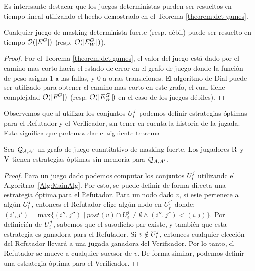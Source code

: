 	Es interesante destacar que los juegos deterministas pueden ser resueltos en tiempo lineal utilizando el hecho demostrado en el Teorema \ref{theorem:det-games}.
\begin{thm}\label{th:deterministic-qgame-complexity} 
  Cualquier juego de masking determinista fuerte (resp. débil) puede ser resuelto en tiempo $\mathcal{O}(|E^G|)$ (resp. $\mathcal{O}(|E_W^G|)$).
\end{thm}
\begin{proof} Por el Teorema \ref{theorem:det-games}, el valor del juego está dado por el camino mas corto hacia el estado de error en el grafo de juego donde la función de peso asigna $1$ a las fallas, y $0$ a otras transiciones. El algoritmo de Dial \cite{Dial69} puede ser utilizado para obtener el camino mas corto en este grafo, el cual tiene complejidad $\mathcal{O}(|E^G|)$  (resp. $\mathcal{O}(|E^G_W|)$ en el caso de los juegos débiles).
\qedhere
\end{proof} 

Observemos que al utilizar los conjuntos $U^j_i$ podemos definir estrategias óptimas para el Refutador y el Verificador, sin tener en cuenta la historia de la jugada. Esto significa que podemos dar el siguiente teorema.
 
\begin{thm} \label{thm:memoryless} Sea $\mathcal{Q}_{A, A'}$ un grafo de juego cuantitativo de masking fuerte.
  Los jugadores $\mathrm{R}$ y $\mathrm{V}$ tienen estrategias óptimas sin memoria para $\mathcal{Q}_{A, A'}$.
\end{thm}
\begin{proof} Para un juego dado podemos computar los conjuntos $U^j_i$ utilizando el Algoritmo~\ref{Alg:MainAlg}.
Por esto, se puede definir de forma directa una estrategia óptima para el Refutador. 
Para un nodo dado $v$, si este pertenece a algún $U^j_i$, entonces el Refutador elige algún nodo en $U^{j'}_{i'}$ donde: 
$(i', j') = \text{max}\{(i'', j'') \mid post(v) \cap U^{j}_{i} \neq \emptyset \wedge (i'',j'') < (i,j) \}$. 
Por definición de $U^j_i$, sabemos que el susodicho par existe, y también que esta estrategia es ganadora para el Refutador. Si $v \notin U^j_i$, entonces cualquier elección del Refutador llevará a una jugada ganadora del Verificador. 
Por lo tanto, el Refutador se mueve a cualquier sucesor de $v$.
De forma similar, podemos definir una estrategia óptima para el Verificador.
\qedhere 
\end{proof} \\


